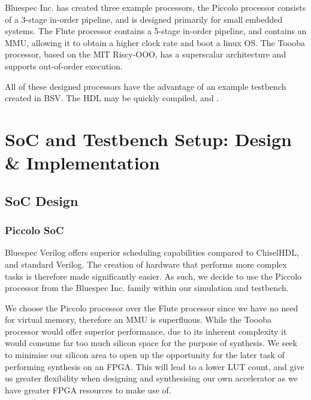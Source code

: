 \documentclass[a4paper,8pt]{report}
\begin{document}
Bluespec Inc. has created three example processors, the Piccolo processor
consists of a 3-stage in-order pipeline, and is designed primarily for small
embedded systems. The Flute processor contains a 5-stage in-order pipeline, and
contains an MMU, allowing it to obtain a higher clock rate and boot a linux OS.
The Toooba processor, based on the MIT Riscy-OOO, has a superscalar architecture
and supports out-of-order execution.

All of these designed processors have the advantage of an example testbench
created in BSV. The HDL may be quickly compiled, and .




\chapter{SoC and Testbench Setup: Design \& Implementation}

\section{SoC Design}
\subsection{Piccolo SoC}
Bluespec Verilog offers superior scheduling capabilities compared to ChiselHDL,
and standard Verilog. The creation of hardware that performs more complex tasks
is therefore made significantly easier. As such, we decide to use the Piccolo
processor from the Bluespec Inc. family within our simulation and testbench.

We choose the Piccolo processor over the Flute processor since we have no need
for virtual memory, therefore an MMU is superfluous. While the Toooba processor
would offer superior performance, due to its inherent complexity it would
consume far too much silicon space for the purpose of synthesis. We seek to
minimise our silicon area to open up the opportunity for the later task of
performing synthesis on an FPGA. This will lead to a lower LUT count, and give
us greater flexibility when designing and synthesising our own accelerator as we
have greater FPGA resources to make use of.
\end{document}
